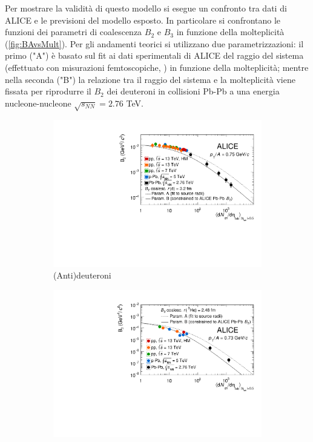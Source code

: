 Per mostrare la validità di questo modello si esegue un confronto tra dati di ALICE e le previsioni del modello esposto.
In particolare si confrontano le funzioni dei parametri di coalescenza $B_2$ e $B_3$ in funzione della molteplicità \cite{alice_2022_coal_formula} (\autoref{fig:BAvsMult}).
Per gli andamenti teorici si utilizzano due parametrizzazioni: il primo ("A") è basato sul fit ai dati sperimentali di ALICE del raggio del sistema (effettuato con misurazioni femtoscopiche, \cite{PhysRevD.87.052016_femto}) in funzione della molteplicità; mentre nella seconda ("B") la relazione tra il raggio del sistema e la molteplicità viene fissata per riprodurre il $B_2$ dei deuteroni in collisioni Pb-Pb a una energia nucleone-nucleone $\sqrt{s_{NN}} = 2.76$ TeV.
\begin{figure}[h]
    \centering
    \begin{subfigure}{.49\textwidth}
    \centering
        \includegraphics[width=\textwidth]{image/2-modelli/cB2vsMult.pdf}
        \caption{(Anti)deuteroni}
        \label{fig:cB2vsMult}
    \end{subfigure}
    \begin{subfigure}{.49\textwidth}
        \centering
        \includegraphics[width=\textwidth]{image/2-modelli/cB3vsMult.pdf}

\end{subfigure}
\end{figure}
